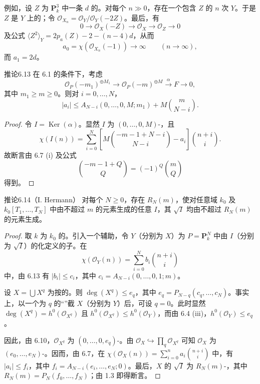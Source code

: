 例如，设 $Z$ 为 $\mathbf P^3_k$ 中一条 $d$ 的。对每个 $n\gg0$，存在一个包含 $Z$ 的 $n$ 次 $Y$。于是 $Z$ 是 $Y$ 上的；令 $\mathscr O_{X_n}=\mathscr O_Y/\mathscr O_Y(-2Z)$。最后，有
\[0\longrightarrow\mathscr O_X(-Z)\longrightarrow\mathscr O_X\longrightarrow\mathscr O_Z\longrightarrow0\]
及公式 $\langle Z^2\rangle_Y=2p_a(Z)-2-(n-4)d$，从而
\[a_0=\chi(\mathscr O_{X_n}(-1))\longrightarrow\infty\qquad(n\to\infty),\]
而 $a_1=2d$。
\begin{SGAresult}{推论}{6.13}
在 6.1 的条件下，考虑
\[\mathscr O_P(-m_1)^{\oplus M_1}\longrightarrow\mathscr O_P(-m)^{\oplus M}\xrightarrow{\alpha}F\longrightarrow0,\]
其中 $m_1\geq m\geq0$。则对 $i=0,\ldots,N$，
\[|a_i|\leq A_{N-i}(0,\ldots,0,M;m_1)+M\binom{m}{N-i}.\]
\end{SGAresult}
\begin{proof}
令 $I=\operatorname{Ker}(\alpha)$。显然 $I$ 为 $(0,\ldots,0,M)$-，且
\[\chi(I(n))=\sum_{i=0}^N\left[M\binom{-m-1+N-i}{N-i}-a_i\right]\binom{n+i}{i}.\]
故断言由 6.7 (i) 及公式
\[\binom{-m-1+Q}{Q}=(-1)^Q\binom{m}{Q}\]
得到。
\end{proof}
\begin{SGAresult}{推论}{6.14（I. Hermann）}
对每个 $N\geq0$，存在 $R_N(m)$，使对任意域 $k_0$ 及 $k_0[T_1,\ldots,T_N]$ 中由不超过 $m$ 的元素生成的任意 $I$，其 $\sqrt I$ 均由不超过 $R_N(m)$ 的元素生成。
\end{SGAresult}
\begin{proof}
取 $k$ 为 $k_0$ 的。引入一个辅助，令 $Y$（分别为 $X$）为 $P=\mathbf P^N_k$ 中由 $I$（分别为 $\sqrt I$）的化定义的子。在
\[\chi(\mathscr O_Y(n))=\sum_{i=0}^N b_i\binom{n+i}{i}\]
中，由 6.13 有 $|b_i|\leq c_i$，其中 $c_i=A_{N-i}(0,\ldots,0,1;m)$。

设 $X=\bigcup X^q$ 为按的。则 $\deg(X^q)\leq e_q$，其中 $e_q=P_{N-q}(c_q,\ldots,c_N)$。事实上，以一个为 $q$ 的“”截 $X$（分别为 $Y$）后，可设 $q=0$。此时显然 $\deg(X^q)=h^0(\mathscr O_{X^q})$ 且 $h^0(\mathscr O_{X^q})\leq h^0(\mathscr O_Y)$，而由 6.4 (iii)，$h^0(\mathscr O_Y)\leq e_q$。

因此，由 6.10，$\mathscr O_{X^q}$ 为 $(0,\ldots,0,e_q)$-。由 $\mathscr O_X\hookrightarrow\prod_q\mathscr O_{X^q}$ 可知 $\mathscr O_X$ 为 $(e_0,\ldots,e_N)$-。因而，由 6.7，在 $\chi(\mathscr O_X(n))=\sum_{i=0}^n a_i\binom{n+i}{i}$ 中，有 $|a_i|\leq f_i$，其中 $f_i=A_{N-i}(e_i,\ldots,e_N;0)$。最后，$X$ 的 $\sqrt I$ 为 $R_N(m)$-，其中 $R_N(m)=P_N(f_0,\ldots,f_N)$；由 1.3 即得断言。
\end{proof}
